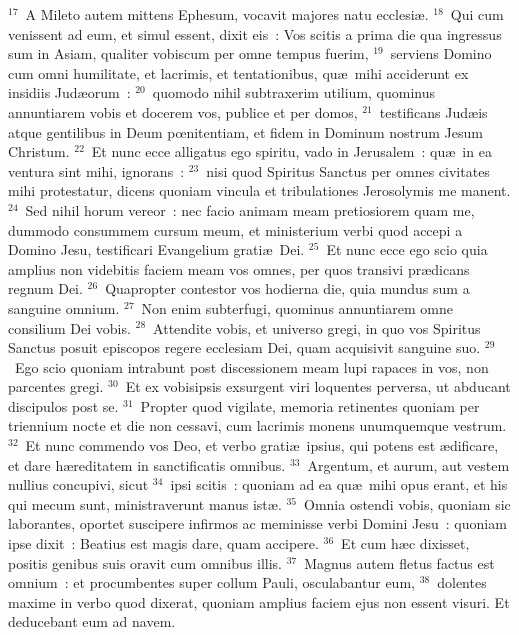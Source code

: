${}^{17}$~A Mileto autem mittens Ephesum, vocavit majores natu ecclesi\ae .
${}^{18}$~Qui cum venissent ad eum, et simul essent, dixit eis~: Vos scitis a prima die qua ingressus sum in Asiam, qualiter vobiscum per omne tempus fuerim,
${}^{19}$~serviens Domino cum omni humilitate, et lacrimis, et tentationibus, qu\ae\ mihi acciderunt ex insidiis Jud\ae orum~:
${}^{20}$~quomodo nihil subtraxerim utilium, quominus annuntiarem vobis et docerem vos, publice et per domos,
${}^{21}$~testificans Jud\ae is atque gentilibus in Deum pœnitentiam, et fidem in Dominum nostrum Jesum Christum.
${}^{22}$~Et nunc ecce alligatus ego spiritu, vado in Jerusalem~: qu\ae\ in ea ventura sint mihi, ignorans~:
${}^{23}$~nisi quod Spiritus Sanctus per omnes civitates mihi protestatur, dicens quoniam vincula et tribulationes Jerosolymis me manent.
${}^{24}$~Sed nihil horum vereor~: nec facio animam meam pretiosiorem quam me, dummodo consummem cursum meum, et ministerium verbi quod accepi a Domino Jesu, testificari Evangelium grati\ae\ Dei.
${}^{25}$~Et nunc ecce ego scio quia amplius non videbitis faciem meam vos omnes, per quos transivi pr\ae dicans regnum Dei.
${}^{26}$~Quapropter contestor vos hodierna die, quia mundus sum a sanguine omnium.
${}^{27}$~Non enim subterfugi, quominus annuntiarem omne consilium Dei vobis.
${}^{28}$~Attendite vobis, et universo gregi, in quo vos Spiritus Sanctus posuit episcopos regere ecclesiam Dei, quam acquisivit sanguine suo.
${}^{29}$~Ego scio quoniam intrabunt post discessionem meam lupi rapaces in vos, non parcentes gregi.
${}^{30}$~Et ex vobisipsis exsurgent viri loquentes perversa, ut abducant discipulos post se.
${}^{31}$~Propter quod vigilate, memoria retinentes quoniam per triennium nocte et die non cessavi, cum lacrimis monens unumquemque vestrum.
${}^{32}$~Et nunc commendo vos Deo, et verbo grati\ae\ ipsius, qui potens est \ae dificare, et dare h\ae reditatem in sanctificatis omnibus.
${}^{33}$~Argentum, et aurum, aut vestem nullius concupivi, sicut
${}^{34}$~ipsi scitis~: quoniam ad ea qu\ae\ mihi opus erant, et his qui mecum sunt, ministraverunt manus ist\ae .
${}^{35}$~Omnia ostendi vobis, quoniam sic laborantes, oportet suscipere infirmos ac meminisse verbi Domini Jesu~: quoniam ipse dixit~: Beatius est magis dare, quam accipere.
${}^{36}$~Et cum h\ae c dixisset, positis genibus suis oravit cum omnibus illis.
${}^{37}$~Magnus autem fletus factus est omnium~: et procumbentes super collum Pauli, osculabantur eum,
${}^{38}$~dolentes maxime in verbo quod dixerat, quoniam amplius faciem ejus non essent visuri. Et deducebant eum ad navem.

